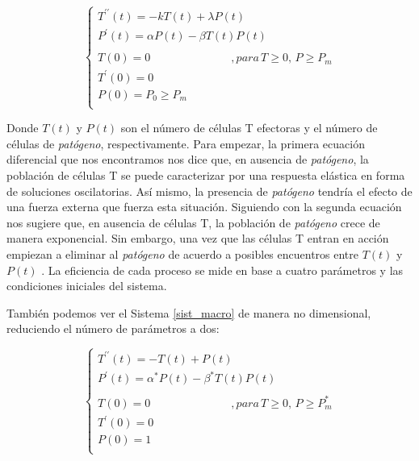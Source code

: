 \begin{equation}
	\label{sist_macro}
	\left\{ \begin{array}{l}
	{T^{\prime\prime}}(t) = -kT(t) + \lambda P(t) \\
	{P^{\prime}}(t) = \alpha P(t) - \beta T(t)P(t) \\
	\\
	T(0)=0 \hspace{3cm} ,para\, T \geq 0,\, P \geq P_m \\
	T^{\prime}(0)=0  \\
	P(0)=P_0 \geq P_m  \\ 
	\end{array}
	\right.
\end{equation}

Donde $T(t)$ y $P(t)$ son el número de células T efectoras y el número de células de \textit{patógeno}, respectivamente. Para empezar, la primera ecuación diferencial que nos encontramos nos dice que, en ausencia de \textit{patógeno}, la población de células T se puede caracterizar por una respuesta elástica en forma de soluciones oscilatorias. Así mismo, la presencia de \textit{patógeno} tendría el efecto de una fuerza externa que fuerza esta situación. Siguiendo con la segunda ecuación nos sugiere que, en ausencia de células T, la población de \textit{patógeno} crece de manera exponencial. Sin embargo, una vez que las células T entran en acción empiezan a eliminar al \textit{patógeno} de acuerdo a posibles encuentros entre $T(t)$ y $P(t)$ \citep{arias2016emergent}. La eficiencia de cada proceso se mide en base a cuatro parámetros y las condiciones iniciales del sistema. 

También podemos ver el Sistema \ref{sist_macro} de manera no dimensional, reduciendo el número de parámetros a dos: 

\begin{equation}
	\label{sist_macro_nod}
	\left\{ \begin{array}{l}
	{T^{\prime\prime}}(t) = -T(t) + P(t) \\
	{P^{\prime}}(t) = \alpha^{*} P(t) - \beta^{*} T(t)P(t) \\
	\\
	T(0)=0 \hspace{3cm} ,para\, T \geq 0,\, P \geq P_m^{*} \\
	T^{\prime}(0)=0  \\
	P(0)=1 \\ 
	\end{array}
	\right.
\end{equation}

